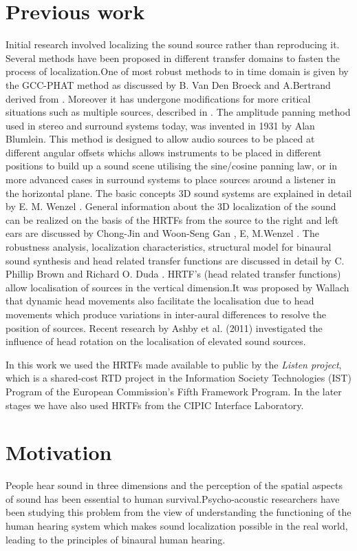 \documentclass[BTech]{nitkdiss}
\begin{document}
\section{Previous work}
Initial research involved localizing the sound source rather than reproducing it. Several methods have been proposed in different transfer domains to fasten the process of localization.One of most robust methods to in time domain is given by the GCC-PHAT method as discussed by B. Van Den Broeck and A.Bertrand \cite{one} derived from \cite{two}. Moreover it has undergone modifications for more critical situations such as multiple sources, described in \cite{three}.\newline
The amplitude panning method used
in stereo and surround systems today, was invented in 1931 by Alan Blumlein. This method is designed to allow audio sources to be placed at different angular offsets whichs allows instruments to be placed in different positions to build up a sound scene utilising the sine/cosine panning law, or in more advanced cases in surround systems to place sources around a listener in the horizontal plane. The basic concepts 3D sound systems are explained in detail by E. M. Wenzel \cite{four}. General information about the 3D localization of the sound can be realized on the basis of the HRTFs from the source to the right and left ears are discussed by Chong-Jin and Woon-Seng Gan \cite{six}, E, M.Wenzel \cite{four}. The  robustness  analysis,  localization  characteristics,  structural  model  for  binaural  sound  synthesis  and  head  
related transfer functions are discussed in detail by C. Phillip Brown and Richard O. Duda \cite{seven} . HRTF’s (head related transfer functions) allow
localisation of sources in the vertical dimension.It was proposed by Wallach \cite{eight} that dynamic head movements also facilitate the localisation due to head movements which produce variations in inter-aural differences to resolve the position of sources.
Recent research by Ashby et al. (2011) investigated the influence of head rotation on the localisation of elevated sound sources.

In this work we used the HRTFs made available to public by the \textit{Listen project}, which is a shared-cost RTD project in the Information Society Technologies (IST) Program of the European Commission's Fifth Framework Program. In the later stages we have also used HRTFs from the CIPIC Interface Laboratory.
\section{Motivation}
People hear sound in three dimensions and the perception of the spatial aspects of sound has been essential to human survival.Psycho-acoustic researchers have been studying this problem from the view of understanding the functioning of the human hearing system which makes sound
localization possible in the real world, leading to the principles of binaural human hearing. 
\end{document}
